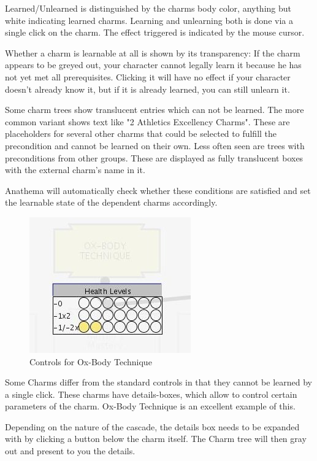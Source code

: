 Learned/Unlearned is distinguished by the charms body color, anything but white indicating learned charms. Learning and unlearning both is done via a single click on the charm. The effect triggered is indicated by the mouse cursor.

Whether a charm is learnable at all is shown by its transparency: If the charm appears to be greyed out, your character cannot legally learn it because he has not yet met all prerequisites. Clicking it will have no effect if your character doesn't already know it, but if it is already learned, you can still unlearn it.

Some charm trees show translucent entries which can not be learned. The more common variant shows text like "2 Athletics Excellency Charms". These are placeholders for several other charms that could be selected to fulfill the precondition and cannot be learned on their own. Less often seen are trees with preconditions from other groups. These are displayed as fully translucent boxes with the external charm's name in it.

Anathema will automatically check whether these conditions are satisfied and set the learnable state of the dependent charms accordingly. 

\begin{figure}
	\centering
		\includegraphics{images/OxBodyTechnique.jpg}
	\caption{Controls for Ox-Body Technique}
	\label{fig:OxBodyTechnique}
\end{figure}

Some Charms differ from the standard controls in that they cannot be learned by a single click. These charms have details-boxes, which allow to control certain parameters of the charm. Ox-Body Technique is an excellent example of this. 

Depending on the nature of the cascade, the details box needs to be expanded with by clicking a button below the charm itself. The Charm tree will then gray out and present to you the details.

